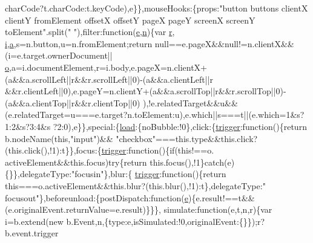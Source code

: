 \begin{DoxyCode}
{{      charCode?t.charCode:t.keyCode),e\}\},mouseHooks:\{props:\textcolor{stringliteral}{"button buttons clientX clientY fromElement offsetX
       offsetY pageX pageY screenX screenY toElement"}.split(\textcolor{stringliteral}{" "}),filter:\textcolor{keyword}{function}(\hyperlink{jquery-1_89_81_8min_8js_a2c038346d47955cbe2cb91e338edd7e1}{e},\hyperlink{root_2static_2root_2js_2bootstrap_2jquery-ui-1_810_84_8custom_8min_8js_afc984c4f6c68ce30a0af99006f5f8d27}{n})\{var \hyperlink{prism_8js_a514f1b439f404f86f77090fa9edc96ce}{r},
      \hyperlink{jquery-1_89_81_8min_8js_a7e98b8a17c0aad30ba64d47b74e2a6c1}{i},\hyperlink{root_2static_2root_2js_2bootstrap_2bootstrap_8min_8js_ae8f6b400ed3390908c5cdeebed3a82b9}{a},s=n.button,u=n.fromElement;\textcolor{keywordflow}{return} null==e.pageX&&null!=n.clientX&&(i=e.target.ownerDocument||
      \hyperlink{jquery-1_89_81_8min_8js_ae47ca7a09cf6781e29634502345930a7}{o},a=i.documentElement,r=i.body,e.pageX=n.clientX+(a&&a.scrollLeft||r&&r.scrollLeft||0)-(a&&a.clientLeft||r
      &&r.clientLeft||0),e.pageY=n.clientY+(a&&a.scrollTop||r&&r.scrollTop||0)-(a&&a.clientTop||r&&r.clientTop||0)
      ),!e.relatedTarget&&u&&(e.relatedTarget=u===e.target?n.toElement:u),e.which||s===t||(e.which=1&s?1:2&s?3:4&s
      ?2:0),e\}\},special:\{\hyperlink{jquery_8js_a8d0b9ec82c308161432f1c387d2fc2a7}{load}:\{noBubble:!0\},click:\{\hyperlink{jquery-migrate-1_82_81_8min_8js_a239df7e8c2edd1a4de69f6e2752cf667}{trigger}:\textcolor{keyword}{function}()\{\textcolor{keywordflow}{return} b.nodeName(\textcolor{keyword}{this},\textcolor{stringliteral}{"input"})&&\textcolor{stringliteral}{
      "checkbox"}===this.type&&this.click?(this.click(),!1):t\}\},focus:\{\hyperlink{jquery-migrate-1_82_81_8min_8js_a239df7e8c2edd1a4de69f6e2752cf667}{trigger}:\textcolor{keyword}{function}()\{\textcolor{keywordflow}{if}(\textcolor{keyword}{this}!==o.
      activeElement&&\textcolor{keyword}{this}.focus)\textcolor{keywordflow}{try}\{\textcolor{keywordflow}{return} this.focus(),!1\}\textcolor{keywordflow}{catch}(e)\{\}\},delegateType:\textcolor{stringliteral}{"focusin"}\},blur:\{
      \hyperlink{jquery-migrate-1_82_81_8min_8js_a239df7e8c2edd1a4de69f6e2752cf667}{trigger}:\textcolor{keyword}{function}()\{\textcolor{keywordflow}{return} \textcolor{keyword}{this}===o.activeElement&&this.blur?(this.blur(),!1):t\},delegateType:\textcolor{stringliteral}{"
      focusout"}\},beforeunload:\{postDispatch:\textcolor{keyword}{function}(\hyperlink{jquery-1_89_81_8min_8js_a2c038346d47955cbe2cb91e338edd7e1}{e})\{e.result!==t&&(e.originalEvent.returnValue=e.result)\}\}\},
      simulate:\textcolor{keyword}{function}(e,t,n,r)\{var i=b.extend(\textcolor{keyword}{new} b.Event,n,\{type:e,isSimulated:!0,originalEvent:\{\}\});r?b.event.trigger
}}
\end{DoxyCode}
